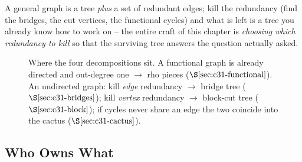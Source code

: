 \begin{insightbox}
A general graph is a tree \emph{plus} a set of redundant edges; kill the redundancy
(find the bridges, the cut vertices, the functional cycles) and what is left is a
tree you already know how to work on -- the entire craft of this chapter is
\emph{choosing which redundancy to kill} so that the surviving tree answers the
question actually asked.
\end{insightbox}

\begin{figure}[H]
\centering
{}
\caption{Where the four decompositions sit. A functional graph is already
directed and out-degree one \(\to\) rho pieces (\(\secref{c31-functional}\)).
An undirected graph: kill \emph{edge} redundancy \(\to\) bridge tree
(\(\secref{c31-bridges}\)); kill \emph{vertex} redundancy \(\to\) block-cut tree
(\(\secref{c31-block}\)); if cycles never share an edge the two coincide into the
cactus (\(\secref{c31-cactus}\)).}
\label{fig:c31-taxonomy}
\end{figure}

\subsection*{Who Owns What}

